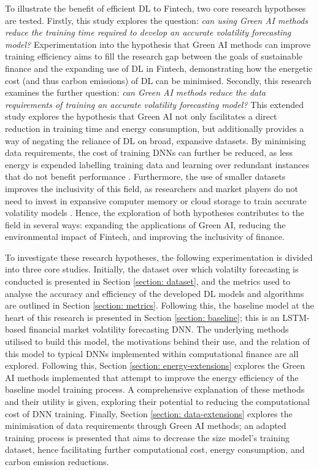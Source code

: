 \documentclass[a4paper, 11pt]{report}
\begin{document}
    To illustrate the benefit of efficient DL to Fintech, two core research hypotheses are tested. Firstly, this study explores the question: \emph{can using Green AI methods reduce the training time required to develop an accurate volatility forecasting model?} Experimentation into the hypothesis that Green AI methods can improve training efficiency aims to fill the research gap between the goals of sustainable finance and the expanding use of DL in Fintech, demonstrating how the energetic cost (and thus carbon emissions) of DL can be minimised. Secondly, this research examines the further question: \emph{can Green AI methods reduce the data requirements of training an accurate volatility forecasting model?} This extended study explores the hypothesis that Green AI not only facilitates a direct reduction in training time and energy consumption, but additionally provides a way of negating the reliance of DL on broad, expansive datasets. By minimising data requirements, the cost of training DNNs can further be reduced, as less energy is expended labelling training data and learning over redundant instances that do not benefit performance \citep{schwartz-2019}. Furthermore, the use of smaller datasets improves the inclusivity of this field, as researchers and market players do not need to invest in expansive computer memory or cloud storage to train accurate volatility models \citep{strubell-2019}. Hence, the exploration of both hypotheses contributes to the field in several ways: expanding the applications of Green AI, reducing the environmental impact of Fintech, and improving the inclusivity of finance.

    To investigate these research hypotheses, the following experimentation is divided into three core studies. Initially, the dataset over which volatilty forecasting is conducted is presented in Section \ref{section: dataset}, and the metrics used to analyse the accuracy and efficiency of the developed DL models and algorithms are outlined in Section \ref{section: metrics}. Following this, the baseline model at the heart of this research is presented in Section \ref{section: baseline}; this is an LSTM-based financial market volatility forecasting DNN. The underlying methods utilised to build this model, the motivations behind their use, and the relation of this model to typical DNNs implemented within computational finance are all explored. Following this, Section \ref{section: energy-extensions} explores the Green AI methods implemented that attempt to improve the energy efficiency of the baseline model training process. A comprehensive explanation of these methods and their utility is given, exploring their potential to reducing the computational cost of DNN training. Finally, Section \ref{section: data-extensions} explores the minimisation of data requirements through Green AI methods; an adapted training process is presented that aims to decrease the size model's training dataset, hence facilitating further computational cost, energy consumption, and carbon emission reductions.
\end{document}
